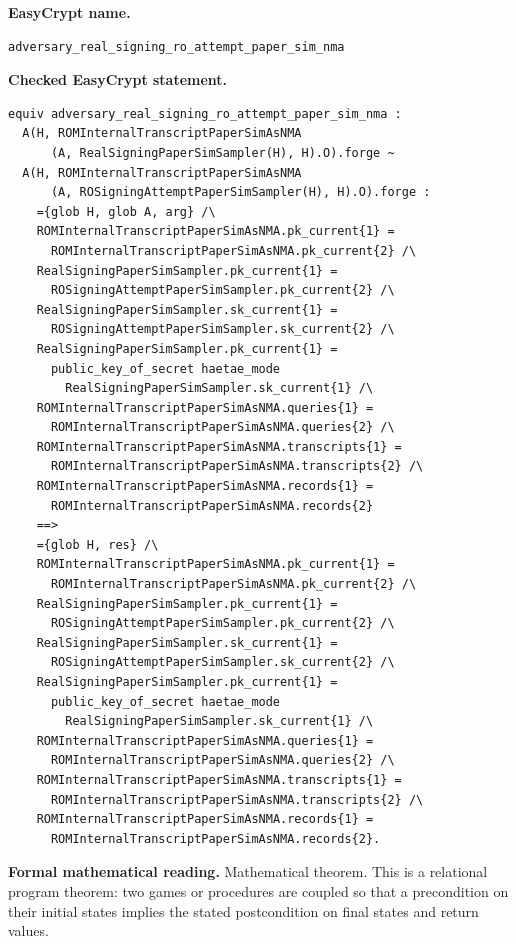 \begin{formaltheorem}
\noindent\textbf{EasyCrypt name.}
\begin{lstlisting}[language=EasyCrypt,basicstyle=\ttfamily\scriptsize]
adversary_real_signing_ro_attempt_paper_sim_nma
\end{lstlisting}
\noindent\textbf{Checked EasyCrypt statement.}
\begin{lstlisting}[language=EasyCrypt,basicstyle=\ttfamily\scriptsize]
equiv adversary_real_signing_ro_attempt_paper_sim_nma :
  A(H, ROMInternalTranscriptPaperSimAsNMA
      (A, RealSigningPaperSimSampler(H), H).O).forge ~
  A(H, ROMInternalTranscriptPaperSimAsNMA
      (A, ROSigningAttemptPaperSimSampler(H), H).O).forge :
    ={glob H, glob A, arg} /\
    ROMInternalTranscriptPaperSimAsNMA.pk_current{1} =
      ROMInternalTranscriptPaperSimAsNMA.pk_current{2} /\
    RealSigningPaperSimSampler.pk_current{1} =
      ROSigningAttemptPaperSimSampler.pk_current{2} /\
    RealSigningPaperSimSampler.sk_current{1} =
      ROSigningAttemptPaperSimSampler.sk_current{2} /\
    RealSigningPaperSimSampler.pk_current{1} =
      public_key_of_secret haetae_mode
        RealSigningPaperSimSampler.sk_current{1} /\
    ROMInternalTranscriptPaperSimAsNMA.queries{1} =
      ROMInternalTranscriptPaperSimAsNMA.queries{2} /\
    ROMInternalTranscriptPaperSimAsNMA.transcripts{1} =
      ROMInternalTranscriptPaperSimAsNMA.transcripts{2} /\
    ROMInternalTranscriptPaperSimAsNMA.records{1} =
      ROMInternalTranscriptPaperSimAsNMA.records{2}
    ==>
    ={glob H, res} /\
    ROMInternalTranscriptPaperSimAsNMA.pk_current{1} =
      ROMInternalTranscriptPaperSimAsNMA.pk_current{2} /\
    RealSigningPaperSimSampler.pk_current{1} =
      ROSigningAttemptPaperSimSampler.pk_current{2} /\
    RealSigningPaperSimSampler.sk_current{1} =
      ROSigningAttemptPaperSimSampler.sk_current{2} /\
    RealSigningPaperSimSampler.pk_current{1} =
      public_key_of_secret haetae_mode
        RealSigningPaperSimSampler.sk_current{1} /\
    ROMInternalTranscriptPaperSimAsNMA.queries{1} =
      ROMInternalTranscriptPaperSimAsNMA.queries{2} /\
    ROMInternalTranscriptPaperSimAsNMA.transcripts{1} =
      ROMInternalTranscriptPaperSimAsNMA.transcripts{2} /\
    ROMInternalTranscriptPaperSimAsNMA.records{1} =
      ROMInternalTranscriptPaperSimAsNMA.records{2}.
\end{lstlisting}
\noindent\textbf{Formal mathematical reading.}
Mathematical theorem. This is a relational program theorem: two games or procedures are coupled so that a precondition on their initial states implies the stated postcondition on final states and return values.


\end{formaltheorem}
